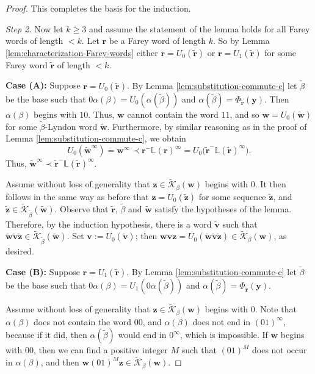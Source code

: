 \documentclass[11pt]{amsart}
\theoremstyle{definition}
\theoremstyle{remark}
\numberwithin{equation}{section}
\renewcommand{\L}{\ensuremath{\mathbb{L}}}
\newcommand{\Kt}{\widetilde{\mathcal{K}}}
\renewcommand{\r}{ {\mathbf{r}}}
\renewcommand{\v}{\mathbf{v}}
\newcommand{\w}{\mathbf{w}}
\newcommand{\y}{\mathbf{y}}
\newcommand{\z}{\mathbf{z}}
\newcommand{\f}{\infty}
\newcommand{\al}{\alpha}
\begin{document}
\begin{proof}
This completes the basis for the induction.

\medskip
{\em Step 2.} Now let $k\geq 3$ and assume the statement of the lemma holds for all Farey words of length $<k$. Let $\r$ be a Farey word of length $k$. So {by Lemma \ref{lem:characterization-Farey-words}} either $\r=U_0(\tilde{\r})$ or $\r=U_1(\tilde{\r})$ for some Farey word $\tilde{\r}$ of length $<k$.

\medskip
{\bf Case (A):} Suppose $\r=U_0(\tilde{\r})$.  {By Lemma \ref{lem:substitution-commute-c} let $\tilde{\beta}$ be the base such that $0\alpha(\beta)=U_0(\alpha(\tilde{\beta}))$ and $\alpha(\tilde{\beta})=\Phi_{\tilde{\r}}(\y)$. Then} $\al(\beta)$ begins with $10$. Thus, $\w$ cannot contain the word $11$, and so $\w=U_0(\tilde{\w})$ for some $\tilde{\beta}$-Lyndon word $\tilde{\w}$. Furthermore, by similar reasoning as in the proof of Lemma \ref{lem:substitution-commute-c}, we obtain
\begin{equation*}
U_0(\tilde{\w}^\f)=\w^\f\prec \r^-\L(\r)^\f=U_0\big(\tilde{\r}^-\L(\tilde{\r})^\f\big).
\end{equation*}
Thus, $\tilde{\w}^\f\prec \tilde{\r}^-\L(\tilde{\r})^\f$.

Assume without loss of generality that $\z\in\Kt_\beta(\w)$ begins with $0$. It then follows in the same way as before that $\z=U_0(\tilde{\z})$ for some sequence $\tilde{\z}$, and $\tilde{\z}\in \Kt_{\tilde\beta}(\tilde{\w})$. %
Observe that {$\tilde{\r}$, $\tilde{\beta}$ and $\tilde{\w}$}  satisfy the hypotheses of the lemma. Therefore, by the induction hypothesis, there is a word $\tilde{\v}$ such that $\tilde{\w}\tilde{\v}\tilde{\z}\in \Kt_{\tilde\beta}(\tilde{\w})$. Set $\v:=U_0(\tilde{\v})$; then $\w\v\z=U_0(\tilde{\w}\tilde{\v}\tilde{\z})\in \Kt_\beta(\w)$,
as desired.

\medskip
{\bf Case (B):} Suppose $\r=U_1(\tilde{\r})$. {By Lemma \ref{lem:substitution-commute-c} let $\tilde{\beta}$ be the base such that $0\alpha(\beta)=U_1(0\alpha(\tilde{\beta}))$ and $\alpha(\tilde{\beta})=\Phi_{\tilde{\r}}(\y)$}.

Assume without loss of generality that $\z\in\Kt_\beta(\w)$ begins with $0$. Note that $\al(\beta)$ does not contain the word $00$, and $\al(\beta)$ does not end in $(01)^\f$, because if it did, then $\al(\tilde{\beta})$ would end in $0^\f$, which is impossible.  If $\w$ begins with $00$, then we can find a positive integer $M$ such that $(01)^M$ does not occur in $\al(\beta)$, and then $\w(01)^M\z\in\Kt_\beta(\w)$.


\end{proof}
\end{document}
